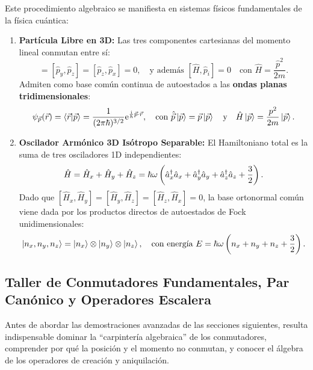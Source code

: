 Este procedimiento algebraico se manifiesta en sistemas físicos fundamentales de la física cuántica:
\begin{enumerate}
    \item \textbf{Partícula Libre en 3D:} Las tres componentes cartesianas del momento lineal conmutan entre sí:
    \begin{equation}
        [\hat{p}_x, \hat{p}_y] = [\hat{p}_y, \hat{p}_z] = [\hat{p}_z, \hat{p}_x] = 0, \quad \text{y además } [\hat{H}, \hat{p}_i] = 0 \quad \text{con } \hat{H} = \frac{\hat{p}^2}{2m}.
    \end{equation}
    Admiten como base común continua de autoestados a las \textbf{ondas planas tridimensionales}:
    \begin{equation}
        \psi_{\vec{p}}(\vec{r}) = \left\langle \vec{r} \middle| \vec{p} \right\rangle = \frac{1}{(2\pi\hbar)^{3/2}}\mathrm{e}^{\frac{\mathrm{i}}{\hbar}\vec{p}\cdot\vec{r}}, \quad \text{con } \hat{\vec{p}}\left| \vec{p} \right\rangle = \vec{p}\left| \vec{p} \right\rangle \quad \text{y} \quad \hat{H}\left| \vec{p} \right\rangle = \frac{p^2}{2m}\left| \vec{p} \right\rangle.
    \end{equation}
    \item \textbf{Oscilador Armónico 3D Isótropo Separable:} El Hamiltoniano total es la suma de tres osciladores 1D independientes:
    \begin{equation}
        \hat{H} = \hat{H}_x + \hat{H}_y + \hat{H}_z = \hbar\omega\left(\hat{a}_x^\dagger\hat{a}_x + \hat{a}_y^\dagger\hat{a}_y + \hat{a}_z^\dagger\hat{a}_z + \frac{3}{2}\right).
    \end{equation}
    Dado que $[\hat{H}_x, \hat{H}_y] = [\hat{H}_y, \hat{H}_z] = [\hat{H}_z, \hat{H}_x] = 0$, la base ortonormal común viene dada por los productos directos de autoestados de Fock unidimensionales:
    \begin{equation}
        \left| n_x, n_y, n_z \right\rangle = \left| n_x \right\rangle \otimes \left| n_y \right\rangle \otimes \left| n_z \right\rangle, \quad \text{con energía } E = \hbar\omega\left(n_x + n_y + n_z + \frac{3}{2}\right).
    \end{equation}
\end{enumerate}

\subsection{Taller de Conmutadores Fundamentales, Par Canónico y Operadores Escalera}
\label{subsec:taller_conmutadores}

Antes de abordar las demostraciones avanzadas de las secciones siguientes, resulta indispensable dominar la \enquote{carpintería algebraica} de los conmutadores, comprender por qué la posición y el momento no conmutan, y conocer el álgebra de los operadores de creación y aniquilación.

